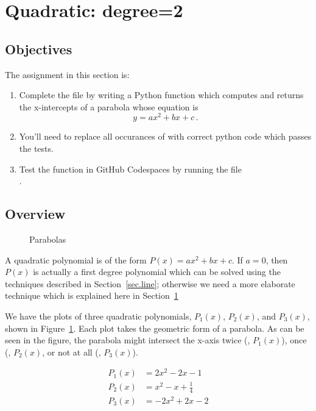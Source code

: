 \section{Quadratic: degree=2}
\label{sec.quadratic}

\subsection{Objectives}
The assignment in this section is:
\begin{enumerate}
\item Complete the file  by writing a Python
  function which computes and returns the x-intercepts of a parabola whose
  equation is \[y=a x^2 + b x + c\,.\]
\item    You'll need to replace all occurances of 
  with correct python code which passes the tests.

\item Test the function in GitHub Codespaces by running the file\\
  .
\end{enumerate}

\subsection{Overview}

\begin{figure}
\centering

\caption{Parabolas}
\label{fig.parabola}
\end{figure}

A quadratic polynomial is of the form $P(x)=a x^2 + b x + c$.  If
$a=0$, then $P(x)$ is actually a first degree polynomial which can be
solved using the techniques described in Section~\ref{sec.line};
otherwise we need a more elaborate technique which is explained here in
Section~\ref{sec.quadratic}

We have the plots of three quadratic polynomials, $P_1(x)$, $P_2(x)$,
and $P_3(x)$, shown in Figure~\ref{fig.parabola}.  Each plot takes the
geometric form of a parabola.  As can be seen in the figure, the
parabola might intersect the x-axis twice (\eg, $P_1(x)$), once (\eg,
$P_2(x)$, or not at all (\eg, $P_3(x)$).

\begin{align*}
  P_1(x) &= 2x^2 - 2 x - 1\\
  P_2(x) &= x^2 -x + \frac{1}{4}\\
  P_3(x) &=  -2x^2 + 2x -2
\end{align*}


